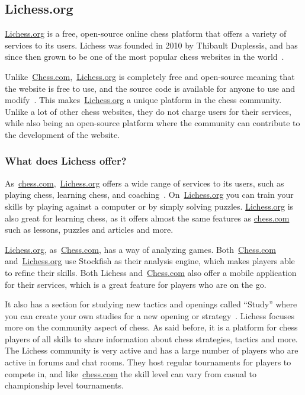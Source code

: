 \subsection{Lichess.org}\label{subsec:lichess-org}

\url{Lichess.org} is a free, open-source online chess platform that offers a variety of services to its users.
Lichess was founded in 2010 by Thibault Duplessis, and has since then grown to be one of the most popular chess websites
in the world~\cite{about-lichess}.

Unlike~\url{Chess.com},~\url{Lichess.org} is completely free and open-source meaning that the website is free to use,
and the source
code is available for anyone to use and modify~\cite{Lichess-Github}.
This makes~\url{Lichess.org} a unique platform in the chess community.
Unlike a lot of other chess websites, they do not charge users for their services, while also being an open-source
platform where the community can contribute to the development of the website.

\subsubsection{What does Lichess offer?}\label{subsubsec:what-does-lichess-offer}

As~\url{chess.com},~\url{Lichess.org} offers a wide range of services to its users, such as playing chess,
learning chess, and coaching~\cite{about-lichess}.
On~\url{Lichess.org} you can train your skills by playing against a computer or by simply solving puzzles.
\url{Lichess.org} is also great for learning chess, as it offers almost the same features as \url{chess.com}
such as lessons, puzzles and articles and more.

\url{Lichess.org}, as~\url{Chess.com}, has a way of analyzing games.
Both~\url{Chess.com} and~\url{Lichess.org} use Stockfish as their analysis engine, which makes players able to
refine their skills.
Both Lichess and~\url{Chess.com} also offer a mobile application for their services, which is a great feature for
players who are on the go.

It also has a section for studying new tactics and openings called “Study” where you can create your own studies for
a new opening or strategy~\cite{Lichess.org}.
Lichess focuses more on the community aspect of chess.
As said before, it is a platform for chess players of all skills to share information about chess strategies,
tactics and more.
The Lichess community is very active and has a large number of players who are active in forums and chat rooms.
They host regular tournaments for players to compete in, and like~\url{chess.com} the skill level can vary
from casual to championship level tournaments.
